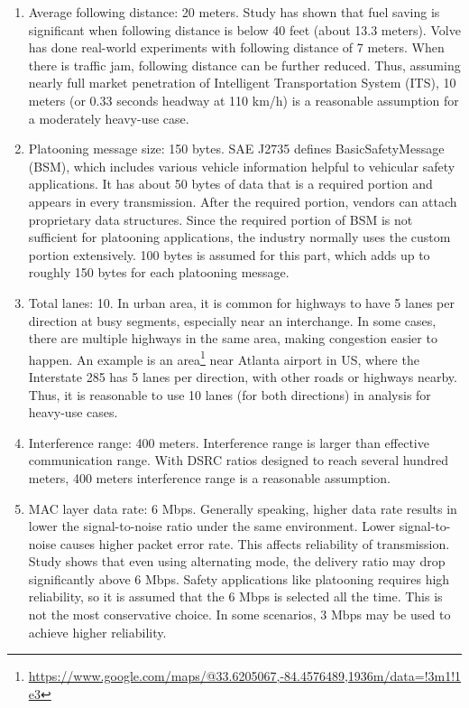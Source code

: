 \documentclass[12pt]{report}
\begin{document}
\begin{enumerate}
  \item Average following distance: 20 meters. Study \cite{watts2015computational} has shown that fuel saving is significant when following distance is below 40 feet (about 13.3 meters). Volve \cite{volvo2015} has done real-world experiments with following distance of 7 meters. When there is traffic jam, following distance can be further reduced. Thus, assuming nearly full market penetration of Intelligent Transportation System (ITS), 10 meters (or 0.33 seconds headway at 110 km/h) is a reasonable assumption for a moderately heavy-use case.
  \item Platooning message size: 150 bytes. SAE J2735 defines BasicSafetyMessage (BSM), which includes various vehicle information helpful to vehicular safety applications. It has about 50 bytes of data that is a required portion and appears in every transmission. After the required portion, vendors can attach proprietary data structures. Since the required portion of BSM is not sufficient for platooning applications, the industry normally uses the custom portion extensively. 100 bytes is assumed for this part, which adds up to roughly 150 bytes for each platooning message.
  \item Total lanes: 10. In urban area, it is common for highways to have 5 lanes per direction at busy segments, especially near an interchange. In some cases, there are multiple highways in the same area, making congestion easier to happen. An example is an area\footnote{\url{https://www.google.com/maps/@33.6205067,-84.4576489,1936m/data=!3m1!1e3}} near Atlanta airport in US, where the Interstate 285 has 5 lanes per direction, with other roads or highways nearby. Thus, it is reasonable to use 10 lanes (for both directions) in analysis for heavy-use cases.
  \item Interference range: 400 meters. Interference range is larger than effective communication range. With DSRC ratios designed to reach several hundred meters, 400 meters interference range is a reasonable assumption.
  \item MAC layer data rate: 6 Mbps. Generally speaking, higher data rate results in lower the signal-to-noise ratio under the same environment. Lower signal-to-noise causes higher packet error rate. This affects reliability of transmission. Study \cite{songDSRC2016} shows that even using alternating mode, the delivery ratio may drop significantly above 6 Mbps. Safety applications like platooning requires high reliability, so it is assumed that the 6 Mbps is selected all the time. This is not the most conservative choice. In some scenarios, 3 Mbps may be used to achieve higher reliability.

\end{enumerate}
\end{document}
